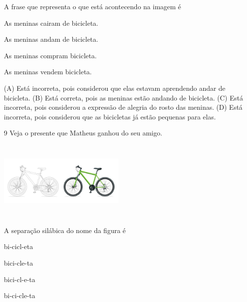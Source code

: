 
A frase que representa o que está acontecendo na imagem é

\begin{escolha}
\item As meninas cairam de bicicleta.

\item As meninas andam de bicicleta.

\item As meninas compram bicicleta.

\item As meninas vendem bicicleta.
\end{escolha}


(A) Está incorreta, pois considerou que elas estavam aprendendo andar de bicicleta.
(B) Está correta, pois as meninas estão andando de bicicleta.
(C) Está incorreta, pois considerou a expressão de alegria do rosto das meninas.
(D) Está incorreta, pois considerou que as bicicletas já estão pequenas para elas.

\num{9} Veja o presente que Matheus ganhou do seu amigo.

\includegraphics[width=2.46250in,height=1.54444in]{media/image180.jpeg}


A separação silábica do nome da figura é

\begin{minipage}{.5\textwidth}
\begin{escolha}
\item bi-cicl-eta

\item bici-cle-ta

\item bici-cl-e-ta

\item bi-ci-cle-ta
\end{escolha}
\end{minipage}

